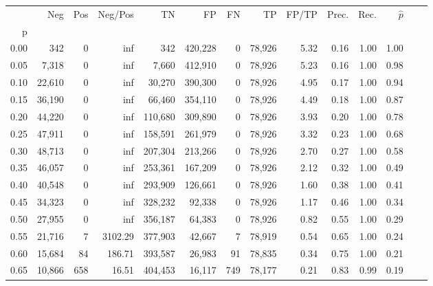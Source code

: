 \begin{tabular}{rrrrrrrrrrrrrr}
\toprule
{} &     Neg &     Pos &  Neg/Pos &       TN &       FP &      FN &      TP & FP/TP & Prec. &  Rec. & $\hat{p}$ \\
p    &         &         &          &          &          &         &         &       &       &       &           \\
\midrule
0.00 &     342 &       0 &      inf &      342 &  420,228 &       0 &  78,926 &  5.32 &  0.16 &  1.00 &      1.00 \\
0.05 &   7,318 &       0 &      inf &    7,660 &  412,910 &       0 &  78,926 &  5.23 &  0.16 &  1.00 &      0.98 \\
0.10 &  22,610 &       0 &      inf &   30,270 &  390,300 &       0 &  78,926 &  4.95 &  0.17 &  1.00 &      0.94 \\
0.15 &  36,190 &       0 &      inf &   66,460 &  354,110 &       0 &  78,926 &  4.49 &  0.18 &  1.00 &      0.87 \\
0.20 &  44,220 &       0 &      inf &  110,680 &  309,890 &       0 &  78,926 &  3.93 &  0.20 &  1.00 &      0.78 \\
0.25 &  47,911 &       0 &      inf &  158,591 &  261,979 &       0 &  78,926 &  3.32 &  0.23 &  1.00 &      0.68 \\
0.30 &  48,713 &       0 &      inf &  207,304 &  213,266 &       0 &  78,926 &  2.70 &  0.27 &  1.00 &      0.58 \\
0.35 &  46,057 &       0 &      inf &  253,361 &  167,209 &       0 &  78,926 &  2.12 &  0.32 &  1.00 &      0.49 \\
0.40 &  40,548 &       0 &      inf &  293,909 &  126,661 &       0 &  78,926 &  1.60 &  0.38 &  1.00 &      0.41 \\
0.45 &  34,323 &       0 &      inf &  328,232 &   92,338 &       0 &  78,926 &  1.17 &  0.46 &  1.00 &      0.34 \\
0.50 &  27,955 &       0 &      inf &  356,187 &   64,383 &       0 &  78,926 &  0.82 &  0.55 &  1.00 &      0.29 \\
0.55 &  21,716 &       7 &  3102.29 &  377,903 &   42,667 &       7 &  78,919 &  0.54 &  0.65 &  1.00 &      0.24 \\
0.60 &  15,684 &      84 &   186.71 &  393,587 &   26,983 &      91 &  78,835 &  0.34 &  0.75 &  1.00 &      0.21 \\
0.65 &  10,866 &     658 &    16.51 &  404,453 &   16,117 &     749 &  78,177 &  0.21 &  0.83 &  0.99 &      0.19 \\

\end{tabular}
